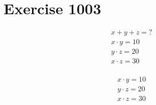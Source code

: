 \documentclass{article}
\begin{document}


\section{Exercise 1003}

\begin{align*}
	x + y + z = ?  \\
	x \cdot y = 10 \\
	y \cdot z = 20 \\
	x \cdot z = 30 \\
\end{align*}

\begin{align*}
	x \cdot y = 10 \\
	y \cdot z = 20 \\
	x \cdot z = 30 \\
\end{align*}

\end{document}

